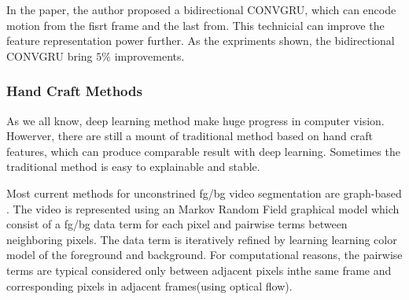 In the paper, the author proposed a bidirectional CONVGRU, which can encode motion from the fisrt frame and the last from. This technicial can improve the feature
representation power further. As the expriments shown, the bidirectional CONVGRU bring $5\%$ improvements.

\subsubsection{Hand Craft Methods}

As we all know, deep learning method make huge progress in computer vision. Howerver, there are still a mount of traditional method based on 
hand craft features, which can produce comparable result with deep learning. Sometimes the traditional method is easy to explainable and stable.

Most current methods for unconstrined fg/bg video segmentation are graph-based \cite{Lee2011Key, Papazoglou2013Fast, zhang2013video}. The video
is represented using an Markov Random Field graphical model which consist of a fg/bg data term for each pixel and pairwise
terms between neighboring pixels. The data term is iteratively refined by learning learning color model of the foreground
and background. For computational reasons, the pairwise  terms are typical considered only between adjacent pixels inthe same 
frame and corresponding pixels in adjacent frames(using optical flow).


